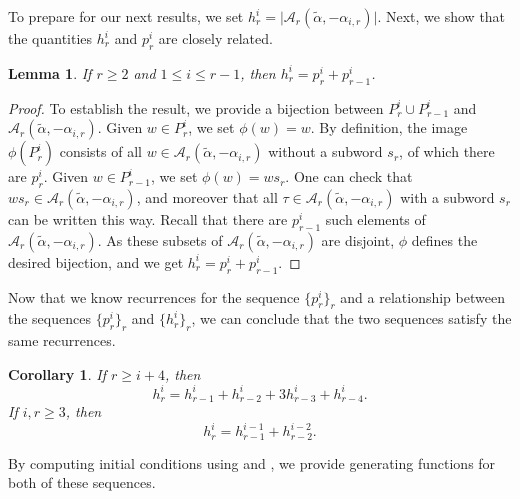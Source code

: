 \documentclass{amsart}
\newtheorem{corollary}[theorem]{Corollary}
\newtheorem{lemma}[theorem]{Lemma}
\theoremstyle{definition}
\newcommand{\hroot}{\tilde{\alpha}}
\begin{document}
To prepare for our next results, we set $h_r^i = \vert \mathcal{A}_r(\hroot, -\alpha_{i,r})\vert$. Next, we show that the quantities $h_r^i$ and $p_r^i$ are closely related.

\begin{lemma}\label{lem:p_is_i_to_r-1}
If $r\geq 2$ and $1\leq i \leq r-1$, then $h_r^i = p_r^i + p_{r-1}^i$.
\end{lemma}

\begin{proof}
To establish the result, we provide a bijection between $P_r^i \cup P_{r-1}^i$ and $\mathcal{A}_r(\hroot, -\alpha_{i,r})$. Given $w \in P_r^i$, we set $\phi(w) = w$. By definition, the image $\phi(P_r^i)$ consists of all $w \in \mathcal{A}_r(\hroot, -\alpha_{i,r})$ without a subword $s_r$, of which there are $p_r^i$. Given $w \in P_{r-1}^i$, we set $\phi(w) = w s_r$. One can check that $w s_r \in \mathcal{A}_r(\hroot, -\alpha_{i,r})$, and moreover that all $\tau \in \mathcal{A}_r(\hroot, -\alpha_{i,r})$ with a subword $s_r$ can be written this way. Recall that there are $p_{r-1}^i$ such elements of $\mathcal{A}_r(\hroot, -\alpha_{i,r})$. As these subsets of $\mathcal{A}_r(\hroot, -\alpha_{i,r})$ are disjoint, $\phi$ defines the desired bijection, and we get $h_r^i = p_r^i + p_{r-1}^i$.
\end{proof}

Now that we know recurrences for the sequence $\{p_r^i\}_r$ and a relationship between the sequences $\{p_r^i\}_r$ and $\{h_r^i\}_r$, we can conclude that the two sequences satisfy the same recurrences.

\begin{corollary}\label{cor:h_recursion}
If $r \geq i+4$, then \[h_r^i = h_{r-1}^i + h_{r-2}^i + 3h_{r-3}^i + h_{r-4}^i.
\] If $i,r\geq 3$, 
then \[h^i_r=h^{i-1}_{r-1}+h^{i-2}_{r-2}.\]
\end{corollary}

By computing initial conditions using  and , we provide generating functions for both of these sequences.
\end{document}
